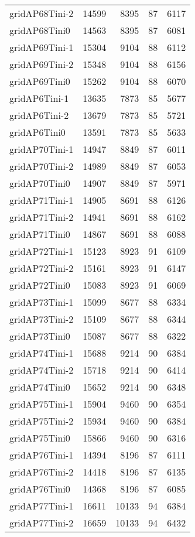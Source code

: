 \begin{longtable}{lrrrr}
gridAP68Tini-2 & 14599 & 8395 & 87 & 6117 \\
gridAP68Tini0 & 14563 & 8395 & 87 & 6081 \\
gridAP69Tini-1 & 15304 & 9104 & 88 & 6112 \\
gridAP69Tini-2 & 15348 & 9104 & 88 & 6156 \\
gridAP69Tini0 & 15262 & 9104 & 88 & 6070 \\
gridAP6Tini-1 & 13635 & 7873 & 85 & 5677 \\
gridAP6Tini-2 & 13679 & 7873 & 85 & 5721 \\
gridAP6Tini0 & 13591 & 7873 & 85 & 5633 \\
gridAP70Tini-1 & 14947 & 8849 & 87 & 6011 \\
gridAP70Tini-2 & 14989 & 8849 & 87 & 6053 \\
gridAP70Tini0 & 14907 & 8849 & 87 & 5971 \\
gridAP71Tini-1 & 14905 & 8691 & 88 & 6126 \\
gridAP71Tini-2 & 14941 & 8691 & 88 & 6162 \\
gridAP71Tini0 & 14867 & 8691 & 88 & 6088 \\
gridAP72Tini-1 & 15123 & 8923 & 91 & 6109 \\
gridAP72Tini-2 & 15161 & 8923 & 91 & 6147 \\
gridAP72Tini0 & 15083 & 8923 & 91 & 6069 \\
gridAP73Tini-1 & 15099 & 8677 & 88 & 6334 \\
gridAP73Tini-2 & 15109 & 8677 & 88 & 6344 \\
gridAP73Tini0 & 15087 & 8677 & 88 & 6322 \\
gridAP74Tini-1 & 15688 & 9214 & 90 & 6384 \\
gridAP74Tini-2 & 15718 & 9214 & 90 & 6414 \\
gridAP74Tini0 & 15652 & 9214 & 90 & 6348 \\
gridAP75Tini-1 & 15904 & 9460 & 90 & 6354 \\
gridAP75Tini-2 & 15934 & 9460 & 90 & 6384 \\
gridAP75Tini0 & 15866 & 9460 & 90 & 6316 \\
gridAP76Tini-1 & 14394 & 8196 & 87 & 6111 \\
gridAP76Tini-2 & 14418 & 8196 & 87 & 6135 \\
gridAP76Tini0 & 14368 & 8196 & 87 & 6085 \\
gridAP77Tini-1 & 16611 & 10133 & 94 & 6384 \\
gridAP77Tini-2 & 16659 & 10133 & 94 & 6432 \\

\end{longtable}
